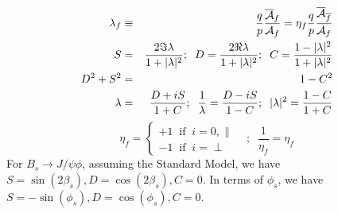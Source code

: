\documentclass[a4paper,9pt,twoside]{article}
\begin{document}
\begin{eqnarray}
   \lambda_f &\equiv& \frac{q}{p}\frac{\overline{\cal A}_f}{{\cal A}_f} = \eta_f\frac{q}{p} \frac{\overline{\cal A}_{\overline{f}}}{{\cal A}_f}\\
   S &=& \frac{2 \Im \lambda}{1+|\lambda|^2};\;\; D = \frac{2 \Re \lambda}{1+|\lambda|^2};\;\; C = \frac{1-|\lambda|^2 }{1+|\lambda|^2}\\
   D^2+S^2 & = & 1 - C^2 \\
   \lambda & = & \frac{D+iS}{1+C};\;\; \frac{1}{\lambda}  =  \frac{D-iS}{1-C};\;\; |\lambda|^2 = \frac{ 1-C }{ 1+C }
\end{eqnarray}
\begin{equation}
  \eta_f = \left\{ \begin{array}{l} +1 \;\; \mathrm{if}\;\; i=0,\parallel  \\ -1\;\; \mathrm{if}\;\; i=\perp \end{array} \right. \;\;\;;\;\; \frac{1}{\eta_f}=\eta_f
  \label{eq:etadef}
\end{equation}
For $B_s\rightarrow J/\psi\phi$, assuming the Standard Model,  we have $S=\sin(2\beta_s),D=\cos(2\beta_s),C=0$.
In terms of $\phi_s$, we have $S=-\sin(\phi_s),D=\cos(\phi_s),C=0$.
\end{document}
